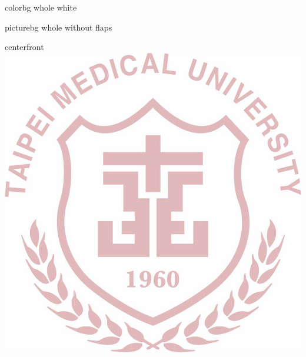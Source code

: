 \documentclass[
    coverwidth=213mm, %
    coverheight=303mm, %
    spinewidth=17.8mm, %
    bleedwidth=3mm,
    12pt,
    trimmed=false
    ]{bookcover}
\begin{document}
\begin{bookcover}


\begin{bookcoverelement}{color}{bg whole}
    white
\end{bookcoverelement}

\begin{bookcoverelement}{picture}{bg whole without flaps}
\end{bookcoverelement}



\begin{bookcoverelement}{center}{front}
    \includegraphics{watermarkTMU.jpg}
\end{bookcoverelement}


\end{bookcover}
\end{document}
